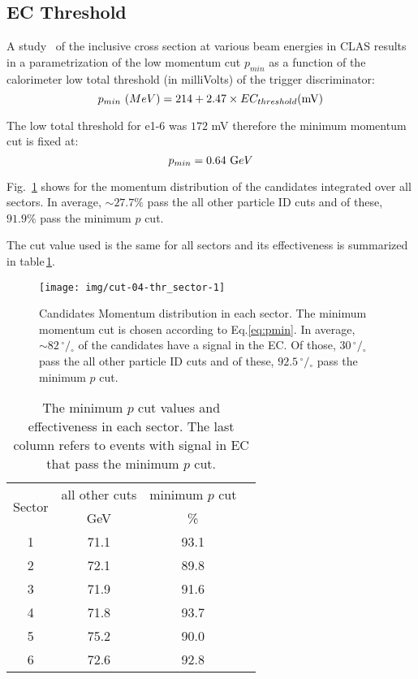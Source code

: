 \clearpage\newpage

\subsection{EC Threshold}\label{subsec:ec-threshold}
A study~\cite{bib:ecmin} of the inclusive cross section at various beam energies in CLAS
results in a parametrization of the low momentum cut $p_{min}$ as a function of
the calorimeter low total threshold (in milliVolts) of the trigger discriminator:
\begin{equation}
    \label{eq:pmin}
    p_{min}\,\,{\textrm (MeV)} = 214 + 2.47\times EC_{threshold}\textrm{(mV)}
\end{equation}

The low total threshold for e1-6 was $172$ mV therefore the minimum momentum cut is fixed at:
\[
p_{min} = 0.64\,\,{\textrm GeV}
\]

Fig.~\ref{fig:pmincut_alls} shows for the momentum distribution of the candidates integrated
over all sectors.
In average, $\sim 27.7\%$  pass the all other particle ID
cuts and of these, $91.9\%$ pass the minimum $p$ cut.

The cut value used is the same for all sectors and its effectiveness is summarized in
table\,\ref{tab:pmincut}.


\begin{figure}[ht]
    \centering
    \texttt{[image: img/cut-04-thr\_sector-1]}
    \caption{Candidates Momentum distribution in each sector. The minimum momentum cut is
    chosen according to Eq.\ref{eq:pmin}. In average, $\sim 82 \,^{\circ\!\!}/\!_\circ$
        of the candidates have a signal in the EC. Of those, $30 \,^{\circ\!\!}/\!_\circ$
        pass the all other particle ID cuts and of these, $92.5 \,^{\circ\!\!}/\!_\circ$
        pass the minimum $p$ cut.}
    \label{fig:pmincut_alls}
\end{figure}


\begin{table}[h]
    \label{tab:pmincut}
    \begin{center}
        \begin{tabular}{c | c | c | c}
            \hline
            \multirow{2}{*}{Sector}
            & all other cuts & minimum $p$ cut \\
            & GeV & \% & \\
            \hline
            1 & 71.1 & 93.1 \\
            2 & 72.1 & 89.8 \\
            3 & 71.9 & 91.6 \\
            4 & 71.8 & 93.7 \\
            5 & 75.2 & 90.0 \\
            6 & 72.6 & 92.8 \\
            \hline
        \end{tabular}
        \caption{The minimum $p$ cut values and effectiveness in each sector.
        The last column refers to events with signal in EC that pass the
        minimum $p$ cut.}

    \end{center}
\end{table}



